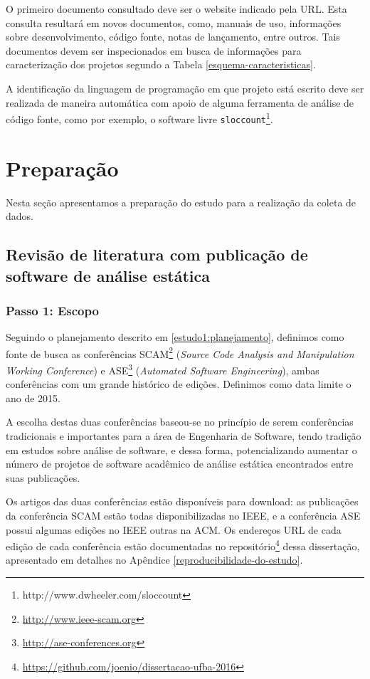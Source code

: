O primeiro documento consultado deve ser o website indicado pela URL. Esta
consulta resultará em novos documentos, como, manuais de uso, informações sobre
desenvolvimento, código fonte, notas de lançamento, entre outros. 
Tais documentos devem ser inspecionados em busca de informações para
caracterização dos projetos segundo a Tabela \ref{esquema-caracteristicas}.

A identificação da linguagem de programação em que projeto está escrito deve ser
realizada de maneira automática com apoio de alguma ferramenta de análise de
código fonte, como por exemplo, o software livre
\texttt{sloccount}\footnote{http://www.dwheeler.com/sloccount}.


\section{Preparação} \label{estudo1:preparacao} %

Nesta seção apresentamos a preparação do estudo para a realização da coleta de
dados.

\subsection{Revisão de literatura com publicação de software de análise estática}

\subsubsection{Passo 1: Escopo}

Seguindo o planejamento descrito em \ref{estudo1:planejamento}, definimos como
fonte de busca as conferências SCAM\footnote{\url{http://www.ieee-scam.org}}
({\it Source Code Analysis and Manipulation Working Conference}) e
ASE\footnote{\url{http://ase-conferences.org}} ({\it Automated Software
Engineering}), ambas conferências com um grande histórico de edições. Definimos
como data limite o ano de 2015.

A escolha destas duas conferências baseou-se no princípio de serem conferências
tradicionais e importantes para a área de Engenharia de Software, tendo tradição
em estudos sobre análise de software, e dessa forma, potencializando aumentar
o número de projetos de software acadêmico de análise estática encontrados
entre suas publicações.

Os artigos das duas conferências estão disponíveis para download:
as publicações da conferência SCAM estão todas disponibilizadas no IEEE, e
a conferência ASE possui algumas edições no IEEE outras na ACM. Os endereços URL
de cada edição de cada conferência estão documentadas no
repositório\footnote{\url{https://github.com/joenio/dissertacao-ufba-2016}}
dessa dissertação, apresentado em detalhes no Apêndice
\ref{reproducibilidade-do-estudo}.

